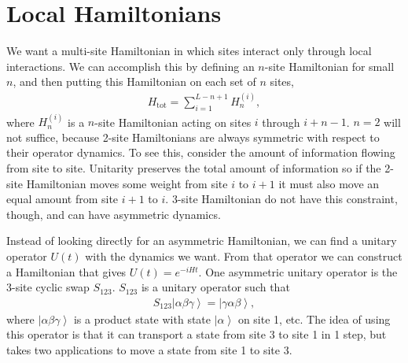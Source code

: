 \documentclass[aps,prx,reprint,superscriptaddress, longbibliography]{revtex4-1}
\newcommand{\charlie}[1]{{\color{Magenta}{{#1}}}}
\renewcommand{\ket}[1]{\left|#1\right\rangle}
\begin{document}

\section{Local Hamiltonians}


We want a multi-site Hamiltonian in which sites interact only through local interactions. We can accomplish this by defining an $n$-site Hamiltonian for small $n$, and then putting this Hamiltonian on each set of $n$ sites,
\begin{align}
H_{\text{tot}} = \sum_{i=1}^{L-n+1}H_n^{(i)},
\label{eqn:chain}
\end{align}
where $H_n^{(i)}$ is a $n$-site Hamiltonian acting on sites $i$ through $i+n-1$.
$n=2$ will not suffice, because 2-site Hamiltonians are always symmetric with respect to their operator dynamics. To see this, consider the amount of information flowing from site to site. Unitarity preserves the total amount of information so if the 2-site Hamiltonian moves some weight from site $i$ to $i+1$ it must also move an equal amount from site $i+1$ to $i$. 3-site Hamiltonian do not have this constraint, though, and can have asymmetric dynamics.

Instead of looking directly for an asymmetric Hamiltonian, we can find a unitary operator $U(t)$ with the dynamics we want. From that operator we can construct a Hamiltonian that gives $U(t)=e^{-iHt}$. One asymmetric unitary operator is the 3-site cyclic swap $S_{123}$. $S_{123}$ is a unitary operator such that
\begin{align}
S_{123}\ket{\alpha\beta\gamma} =\ket{\gamma\alpha\beta}, \label{eqn:condition}
\end{align}
where $\ket{\alpha\beta\gamma}$ is a product state with state $\ket{\alpha}$ on site 1, etc. The idea of using this operator is that it can transport a state from site 3 to site 1 in 1 step, but takes two applications to move a state from site 1 to site 3.
\end{document}

